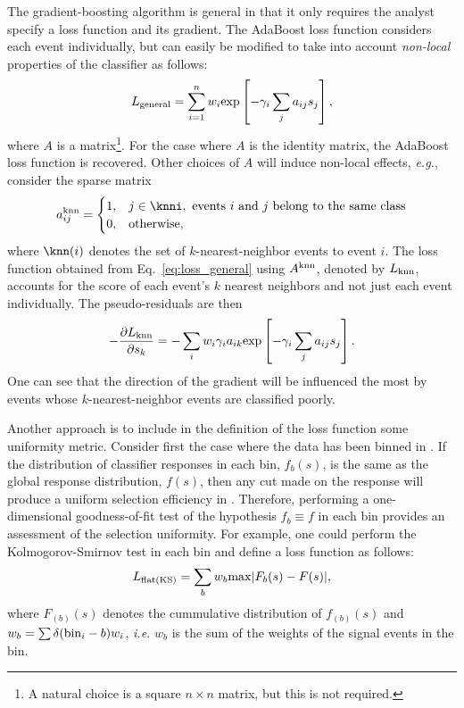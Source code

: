 The gradient-boosting algorithm is general in that it only requires the analyst specify a loss function and its gradient.  The AdaBoost loss function considers each event individually, but can easily be modified to take into account {\em non-local} properties of the classifier as follows:
\begin{equation}
  \label{eq:loss_general}
  L_{\rm general} = \sum\limits_{i=1}^{n} w_i {\rm exp}\left[-\gamma_i \sum\limits_{j} a_{ij} s_j \right], 
\end{equation} 
where $A$ is a matrix\footnote{A natural choice is a square $n\times n$ matrix, but this is not required.}.  For the case where $A$ is the identity matrix, the AdaBoost loss function is recovered.  
Other choices of $A$ will induce non-local effects, {\em e.g.}, consider the sparse matrix 
\begin{equation}
  a_{ij}^{\rm knn} = \begin{cases} 
    1, & j \in \knni, \text{ events $i$ and $j$ belong to the same class} \\
    0, & \text{otherwise},
\end{cases}
\end{equation}
where $\knn(i)$ denotes the set of $k$-nearest-neighbor events to event $i$.   The loss function obtained from Eq.~\ref{eq:loss_general} using $A^{\rm knn}$, denoted by $L_{\rm knn}$, accounts for the score of each event's $k$ nearest neighbors and not just each event individually.
The pseudo-residuals are then
\begin{equation}
  -\frac{\partial L_{\rm knn}}{\partial s_k} = -\sum\limits_i w_i \gamma_i a_{ik} {\rm exp}\left[-\gamma_i \sum_j a_{ij} s_j \right].
\end{equation}
One can see that the direction of the gradient will be influenced the most by events whose $k$-nearest-neighbor events are classified poorly. 

Another approach is to include in the definition of the loss function some uniformity metric.  Consider first the case where the data has been binned in \y.  If the distribution of classifier responses in each bin, $f_b(s)$, is the same as the global response distribution, $f(s)$, then any cut made on the response will produce a uniform selection efficiency in \y.  Therefore, performing a one-dimensional goodness-of-fit test of the hypothesis $f_b \equiv f$ in each bin provides an assessment of the selection uniformity.  
For example, one could perform the Kolmogorov-Smirnov test in each bin and define a loss function as follows:
\begin{equation}
  L_{\rm flat(KS)} = \sum\limits_{b} w_b {\rm max}|F_b(s)-F(s)|,
\end{equation}
where $F_{(b)}(s)$ denotes the cummulative distribution of $f_{(b)}(s)$ and $w_b = \sum \delta({\rm bin}_i - b) w_i$, {\em i.e.} $w_b$ is the sum of the weights of the signal events in the bin.   

